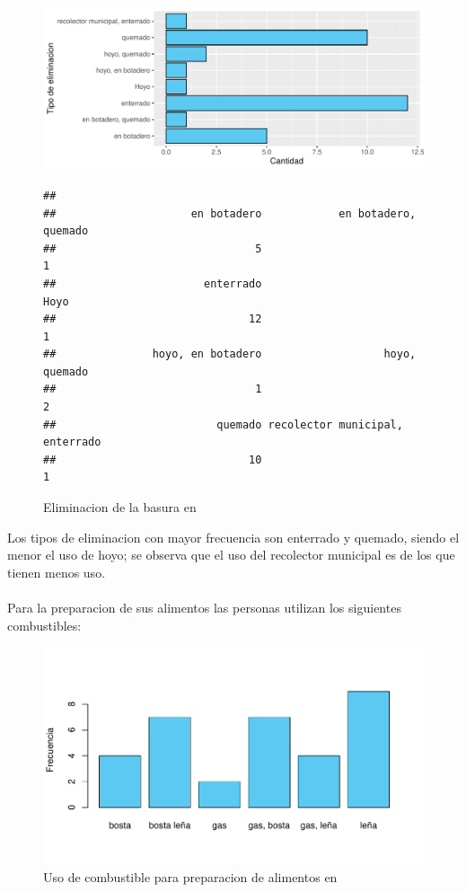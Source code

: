 \documentclass[12pt]{article}\usepackage[]{graphicx}\usepackage[]{xcolor}
\makeatletter
\def\maxwidth{ %
  \ifdim\Gin@nat@width>\linewidth
    \linewidth
  \else
    \Gin@nat@width
  \fi
}
\newenvironment{kframe}{%
 \def\at@end@of@kframe{}%
 \ifinner\ifhmode%
  \def\at@end@of@kframe{\end{minipage}}%
  \begin{minipage}{\columnwidth}%
 \fi\fi%
 \def\FrameCommand##1{\hskip\@totalleftmargin \hskip-\fboxsep
 \colorbox{shadecolor}{##1}\hskip-\fboxsep
     \hskip-\linewidth \hskip-\@totalleftmargin \hskip\columnwidth}%
 \MakeFramed {\advance\hsize-\width
   \@totalleftmargin\z@ \linewidth\hsize
   \@setminipage}}%
 {\par\unskip\endMakeFramed%
 \at@end@of@kframe}
\newenvironment{knitrout}{}{} %
\makeatother
\begin{document}
	\begin{figure}[H]
	\centering
\begin{knitrout}
\color{fgcolor}
\includegraphics[width=\maxwidth]{figure/siete-1} 
\begin{kframe}\begin{verbatim}
## 
##                     en botadero            en botadero, quemado 
##                               5                               1 
##                       enterrado                            Hoyo 
##                              12                               1 
##               hoyo, en botadero                   hoyo, quemado 
##                               1                               2 
##                         quemado recolector municipal, enterrado 
##                              10                               1
\end{verbatim}
\end{kframe}
\end{knitrout}
	\caption{Eliminacion de la basura en \comunidad}
	\end{figure}
	Los tipos de eliminacion con mayor frecuencia son enterrado y quemado, siendo el menor el uso de hoyo; se observa que el uso del recolector municipal es de los que tienen menos uso.\\
	\\
	Para la preparacion de sus alimentos las personas utilizan los siguientes combustibles:
	\begin{figure}[H]
	\centering
\begin{knitrout}
\color{fgcolor}
\includegraphics[width=\maxwidth]{figure/ocho-1} 
\end{knitrout}
	\caption{Uso de combustible para preparacion de alimentos en \comunidad}
	\end{figure}
\end{document}
